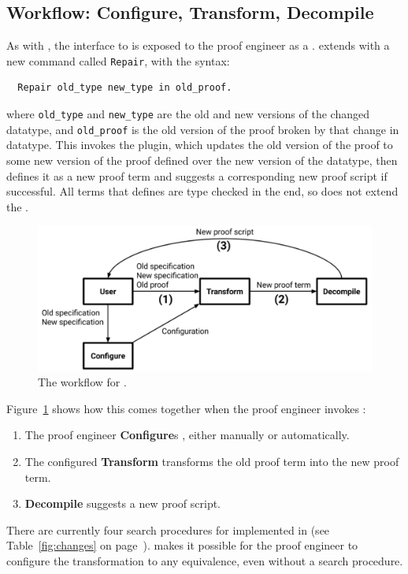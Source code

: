 \subsection{Workflow: Configure, Transform, Decompile}
\label{sec:pi-workflow}

As with \sysname, the interface to \toolnamec is exposed to the proof engineer as a .
\toolnamec extends \sysnamelong with a new command called \lstinline{Repair},
with the syntax:

\begin{lstlisting}
  Repair old_type new_type in old_proof.
\end{lstlisting}
where \lstinline{old_type} and \lstinline{new_type} are the old and new 
versions of the changed datatype, and \lstinline{old_proof} is the old version
of the proof broken by that change in datatype.
This invokes the \toolnamec plugin, which updates the old version of the proof to some new version of the proof
defined over the new version of the datatype, then defines it as a new proof term and suggests a corresponding new proof script if successful.
All terms that \toolnamec defines are type checked in the end, so \toolnamec does not extend the .

\begin{figure}
\includegraphics[width=\columnwidth]{often/workflowa.pdf}
\vspace{-0.7cm}
\caption{The workflow for \toolnamec.}
\vspace{-0.1cm}
\label{fig:system}
\end{figure}

Figure~\ref{fig:system} shows how this comes together when the proof engineer invokes \toolnamec:

\begin{enumerate}
\item The proof engineer \textbf{Configure}s \toolnamec, either manually or automatically.
\item The configured \textbf{Transform} transforms the old proof term into the new proof term.
\item \textbf{Decompile} suggests a new proof script. %
\end{enumerate}
There are currently four search procedures for  implemented in \toolnamec (see Table~\ref{fig:changes} on page~\pageref{fig:changes}).
 makes it possible
for the proof engineer to configure the transformation to any equivalence,
even without a search procedure.

